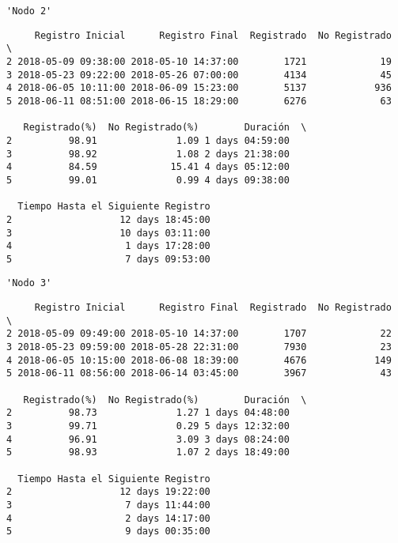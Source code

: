 \documentclass[11pt]{article}
\begin{document}
    
    \begin{verbatim}
'Nodo 2'
    \end{verbatim}

    
    
    \begin{verbatim}
     Registro Inicial      Registro Final  Registrado  No Registrado  \
2 2018-05-09 09:38:00 2018-05-10 14:37:00        1721             19   
3 2018-05-23 09:22:00 2018-05-26 07:00:00        4134             45   
4 2018-06-05 10:11:00 2018-06-09 15:23:00        5137            936   
5 2018-06-11 08:51:00 2018-06-15 18:29:00        6276             63   

   Registrado(%)  No Registrado(%)        Duración  \
2          98.91              1.09 1 days 04:59:00   
3          98.92              1.08 2 days 21:38:00   
4          84.59             15.41 4 days 05:12:00   
5          99.01              0.99 4 days 09:38:00   

  Tiempo Hasta el Siguiente Registro  
2                   12 days 18:45:00  
3                   10 days 03:11:00  
4                    1 days 17:28:00  
5                    7 days 09:53:00  
    \end{verbatim}

    
    
    \begin{verbatim}
'Nodo 3'
    \end{verbatim}

    
    
    \begin{verbatim}
     Registro Inicial      Registro Final  Registrado  No Registrado  \
2 2018-05-09 09:49:00 2018-05-10 14:37:00        1707             22   
3 2018-05-23 09:59:00 2018-05-28 22:31:00        7930             23   
4 2018-06-05 10:15:00 2018-06-08 18:39:00        4676            149   
5 2018-06-11 08:56:00 2018-06-14 03:45:00        3967             43   

   Registrado(%)  No Registrado(%)        Duración  \
2          98.73              1.27 1 days 04:48:00   
3          99.71              0.29 5 days 12:32:00   
4          96.91              3.09 3 days 08:24:00   
5          98.93              1.07 2 days 18:49:00   

  Tiempo Hasta el Siguiente Registro  
2                   12 days 19:22:00  
3                    7 days 11:44:00  
4                    2 days 14:17:00  
5                    9 days 00:35:00  
    \end{verbatim}
\end{document}
